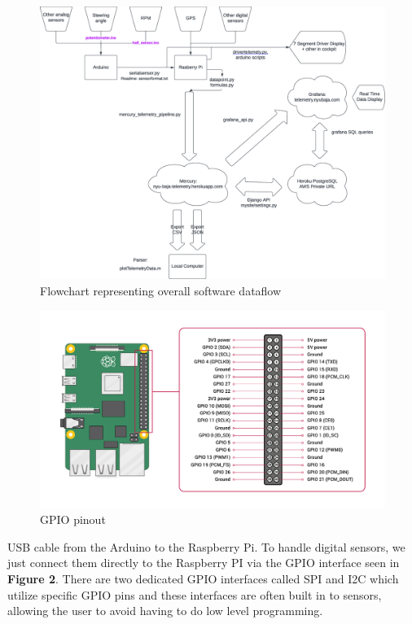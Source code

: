 \documentclass[12pt, letterpaper]{article}
\begin{document}
\begin{figure}[t]
\centering
\includegraphics[width=1\columnwidth]{assets/dataflow.eps}
\caption{Flowchart representing overall software dataflow}
\end{figure}



\begin{figure}
\includegraphics[scale=0.1]{assets/gpio.png}
\caption{GPIO pinout}
\end{figure}


{\par}

\noindent USB cable from the Arduino to the Raspberry Pi. To handle digital sensors, we just connect them directly to the Raspberry PI via the GPIO interface seen in \textbf{Figure 2}. There are two dedicated GPIO interfaces called SPI and I2C which utilize specific GPIO pins and these interfaces are often built in to sensors, allowing the user to avoid having to do low level programming.
\end{document}
